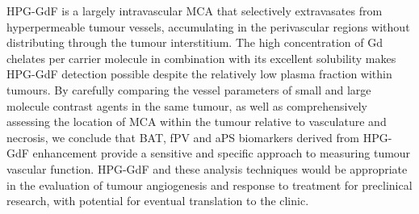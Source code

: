 HPG-GdF is a largely intravascular MCA that selectively extravasates from hyperpermeable tumour vessels, accumulating in the perivascular regions without distributing through the tumour interstitium.
The high concentration of Gd chelates per carrier molecule in combination with its excellent solubility makes \acs{HPG-GdF} detection possible despite the relatively low plasma fraction within tumours.
By carefully comparing the vessel parameters of small and large molecule contrast agents in the same tumour, as well as comprehensively assessing the location of MCA within the tumour relative to vasculature and necrosis, we conclude that \acs{BAT}, \acs{fPV} and \acs{aPS} biomarkers derived from \acs{HPG-GdF} enhancement provide a sensitive and specific approach to measuring tumour vascular function.
\acs{HPG-GdF} and these analysis techniques would be appropriate in the evaluation of tumour angiogenesis and response to treatment for preclinical research, with potential for eventual translation to the clinic.

\endinput
